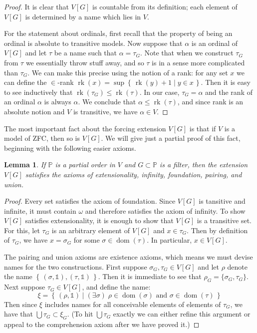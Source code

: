 \documentclass[11pt,oneside,a4paper]{amsbook}
\newcommand{\set}[1]{\left\{\,#1\,\right\}}
\DeclareMathOperator{\dom}{dom}
\DeclareMathOperator{\rk}{rk}
\theoremstyle{definition}
\theoremstyle{plain}
\newtheorem{lemma}[theorem]{Lemma}
\theoremstyle{definition}
\theoremstyle{remark}
\numberwithin{equation}{section}
\numberwithin{figure}{section}
\begin{document}
\begin{proof}
  It is clear that $V[G]$ is countable from its definition; each element of $V[G]$ is determined by a name which lies in $V$.

  For the statement about ordinals, first recall that the property of being an ordinal is absolute to transitive models. Now suppose that $\alpha$ is an ordinal of $V[G]$ and let $\tau$ be a name such that $\alpha=\tau_G$. Note that when we construct $\tau_G$ from $\tau$ we essentially throw stuff away, and so $\tau$ is in a sense more complicated than $\tau_G$. We can make this precise using the notion of a rank: for any set $x$ we can define the $\in$-rank $\rk(x)=\sup\set{\rk(y)+1\mid y\in x}$. Then it is easy to see inductively that $\rk(\tau_G)\leq\rk(\tau)$. In our case, $\tau_G=\alpha$ and the rank of an ordinal $\alpha$ is always $\alpha$. We conclude that $\alpha\leq\rk(\tau)$, and since rank is an absolute notion and $V$ is transitive, we have $\alpha\in V$.
\end{proof}

The most important fact about the forcing extension $V[G]$ is that if $V$ is a model of ZFC, then so is $V[G]$. We will give just a partial proof of this fact, beginning with the following easier axioms.

\begin{lemma}
  If $\mathbb P$ is a partial order in $V$ and $G\subset\mathbb P$ is a filter, then the extension $V[G]$ satisfies the axioms of extensionality, infinity, foundation, pairing, and union.
\end{lemma}

\begin{proof}
  Every set satisfies the axiom of foundation. Since $V[G]$ is tansitive and infinite, it must contain $\omega$ and therefore satisfies the axiom of infinity. To show $V[G]$ satisfies extensionality, it is enough to show that $V[G]$ is a transitive set. For this, let $\tau_G$ is an arbitrary element of $V[G]$ and $x\in\tau_G$. Then by definition of $\tau_G$, we have $x=\sigma_G$ for some $\sigma\in\dom(\tau)$. In particular, $x\in V[G]$.

  The pairing and union axioms are existence axioms, which means we must devise names for the two constructions. First suppose $\sigma_G,\tau_G\in V[G]$ and let $\rho$ denote the name $\set{(\sigma,\mathbb1),(\tau,\mathbb1)}$. Then it is immediate to see that $\rho_G=\{\sigma_G,\tau_G\}$. Next suppose $\tau_G\in V[G]$, and define the name:
  \[\xi=\set{(\rho,\mathbb1)\mid(\exists\sigma)\;\rho\in\dom(\sigma)\text{ and }\sigma\in\dom(\tau)}
  \]
  Then since $\xi$ includes names for all conceivable elements of elements of $\tau_G$, we have that $\bigcup\tau_G\subset\xi_G$. (To hit $\bigcup\tau_G$ exactly we can either refine this argument or appeal to the comprehension axiom after we have proved it.)
\end{proof}
\end{document}
